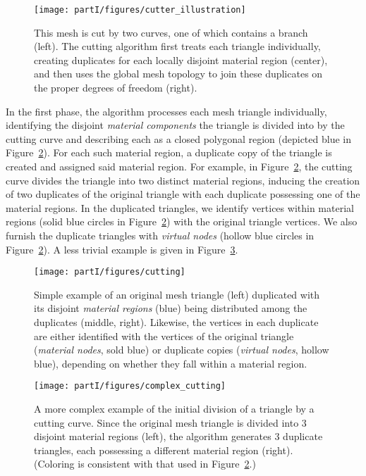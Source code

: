 \setlength{\figurewidth}{\textwidth}
\begin{figure}[htb]
\centering
\texttt{[image: partI/figures/cutter\_illustration]}
\caption{This mesh is cut by two curves, one of which contains a branch (left). The cutting algorithm first treats each triangle individually, creating duplicates for each locally disjoint material region (center), and then uses the global mesh topology to join these duplicates on the proper degrees of freedom (right). }
\label{fig:partI.cutting.example}
\end{figure}

In the first phase, the algorithm processes each mesh triangle individually, identifying the disjoint \emph{material components} the triangle is divided into by the cutting curve and describing each as a closed polygonal region (depicted blue in Figure~\ref{fig:partI.cutting.triangle.2}). For each such material region, a duplicate copy of the triangle is created and assigned said material region. For example, in Figure~\ref{fig:partI.cutting.triangle.2}, the cutting curve divides the triangle into two distinct material regions, inducing the creation of two duplicates of the original triangle with each duplicate possessing one of the material regions. In the duplicated triangles, we identify vertices within material regions (solid blue circles in Figure~\ref{fig:partI.cutting.triangle.2}) with the original triangle vertices. We also furnish the duplicate triangles with \emph{virtual nodes} (hollow blue circles in Figure~\ref{fig:partI.cutting.triangle.2}). A less trivial example is given in Figure~\ref{fig:partI.cutting.triangle.3}.

\setlength{\figureheight}{0.25\textwidth}
\begin{figure}[htb]
\centering
\texttt{[image: partI/figures/cutting]}
\caption{Simple example of an original mesh triangle (left) duplicated with its disjoint \emph{material regions} (blue) being distributed among the duplicates (middle, right). Likewise, the vertices in each duplicate are either identified with the vertices of the original triangle (\emph{material nodes}, sold blue) or duplicate copies (\emph{virtual nodes}, hollow blue), depending on whether they fall within a material region.}
\label{fig:partI.cutting.triangle.2}
\end{figure}

\begin{figure}[htbp]
\centering
\texttt{[image: partI/figures/complex\_cutting]}
\caption{A more complex example of the initial division of a triangle by a cutting curve. Since the original mesh triangle is divided into $3$ disjoint material regions (left), the algorithm generates $3$ duplicate triangles, each possessing a different material region (right). (Coloring is consistent with that used in Figure~\ref{fig:partI.cutting.triangle.2}.)}
\label{fig:partI.cutting.triangle.3}
\end{figure}

